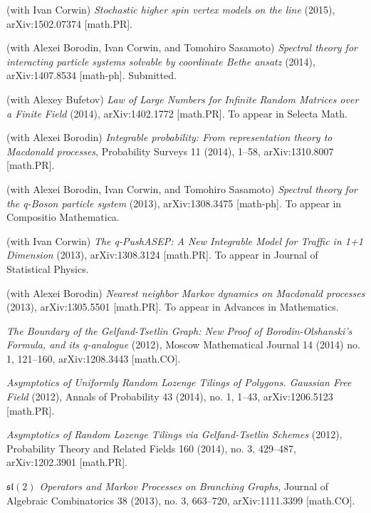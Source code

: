 \documentclass[letterpaper,11pt]{article}
\begin{document}
\begin{etaremune}
    \renewcommand{\labelenumi}{[\theenumi]}
    \item (with Ivan Corwin)
    \emph{Stochastic higher spin vertex models on the line}
    (2015),
    arXiv:1502.07374 [math.PR].
    \item (with Alexei Borodin, Ivan Corwin, and Tomohiro Sasamoto)
    \emph{Spectral theory for interacting particle systems solvable by coordinate Bethe ansatz} (2014), arXiv:1407.8534 [math-ph]. Submitted.
    \item (with Alexey Bufetov)
    \emph{Law of Large Numbers for Infinite Random Matrices over a Finite Field} (2014), arXiv:1402.1772 [math.PR].
    To appear in Selecta Math.
    \item (with Alexei Borodin) 
    \emph{Integrable probability: From representation theory to Macdonald processes}, 
    Probability Surveys 11 (2014), 1--58, arXiv:1310.8007 [math.PR]. 
    \item (with Alexei Borodin, Ivan Corwin, and Tomohiro Sasamoto)
    \emph{Spectral theory for the q-Boson particle system}
    (2013), arXiv:1308.3475 [math-ph]. To appear in Compositio Mathematica.
    \item (with Ivan Corwin)
    \emph{The q-PushASEP: A New Integrable Model for Traffic in 1+1 Dimension} (2013), arXiv:1308.3124 [math.PR]. 
    To appear in Journal of Statistical Physics.
    \item (with Alexei Borodin) 
    \emph{Nearest neighbor Markov dynamics on Macdonald processes} (2013), 
    arXiv:1305.5501 [math.PR].
    To appear in Advances in Mathematics.
    \item \emph{The Boundary of the Gelfand-Tsetlin Graph: New Proof of Borodin-Olshanski's Formula, and its q-analogue} (2012), 
    Moscow Mathematical Journal 14 (2014) no. 1, 121--160,
    arXiv:1208.3443 [math.CO].
    \item \emph{Asymptotics of Uniformly Random Lozenge Tilings of Polygons. Gaussian Free Field} (2012), 
    Annals of Probability 43 (2014), no. 1, 1--43,
    arXiv:1206.5123 [math.PR].
    \item \emph{Asymptotics of Random Lozenge Tilings via Gelfand-Tsetlin Schemes} (2012), 
    Probability Theory and Related Fields 160 (2014), no. 3, 429--487,
    arXiv:1202.3901 [math.PR].
    \item \emph{$\mathfrak{sl}(2)$ Operators and Markov Processes on Branching Graphs},
    Journal of Algebraic Combinatorics 38 (2013), no. 3, 663--720,
    arXiv:1111.3399 [math.CO].

\end{etaremune}
\end{document}
